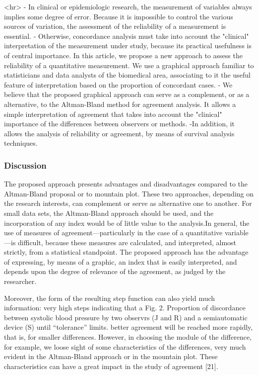 <hr>
- In clinical or epidemiologic research, the measurement of variables always implies some degree of error.
Because it is impossible to control the various sources of variation, the assessment of the reliability of a
measurement is essential. 
- Otherwise, concordance analysis must take into account the "clinical" interpretation 
of the measurement under study, because its practical usefulness is of central importance. In this article, 
we propose a new approach to assess the reliability of a quantitative measurement. We use a graphical approach 
familiar to statisticians and data analysts of the biomedical area, associating to it the useful feature of 
interpretation based on the proportion of concordant cases. 
- We believe that the proposed graphical approach 
can serve as a complement, or as a alternative, to the Altman-Bland method for agreement analysis. It allows
a simple interpretation of agreement that takes into account the "clinical" importance of the differences 
between observers or methods. 
-In addition, it allows the analysis of reliability or agreement, by means of survival analysis techniques.

\subsubsection*{Discussion}
The proposed approach presents advantages and disadvantages compared to the Altman-Bland proposal or to
mountain plot. These two approaches, depending on the research interests, can complement or serve as alternative
one to another. For small data sets, the Altman-Bland approach should be used, and the incorporation of any index
would be of little value to the analysis.In general, the use of measures of agreement—particularly
in the case of a quantitative variable—is difficult, because these measures are calculated, and interpreted, almost
strictly, from a statistical standpoint. The proposed approach has the advantage of expressing, by means of a graphic, an
index that is easily interpreted, and depends upon the degree of relevance of the agreement, as judged by the researcher.

Moreover, the form of the resulting step function can also yield much information: very high steps indicating that a
Fig. 2. Proportion of discordance between systolic blood pressure by two observrs (J and R) and a semiautomatic device (S) until “tolerance” limits.
better agreement will be reached more rapidly, that is, for smaller differences. However, in choosing the module of the difference,
for example, we loose sight of some characteristics of the differences, very much evident in the Altman-Bland
approach or in the mountain plot. These characteristics can have a great impact in the study of agreement [21]. 

